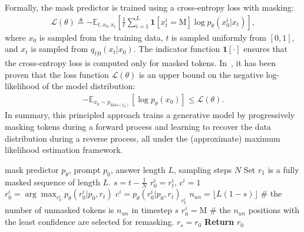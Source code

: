 \documentclass{article}
\begin{document}
Formally, the mask predictor is trained using a cross-entropy loss with masking:
\begin{align}
\label{eq:objective-app}
   \mathcal{L}(\theta) \triangleq -  \mathbb{E}_{t, x_0,  x_t}  \left[\frac{1}{t} \sum_{ i = 1 }^L \textbf{1}[x_t^i = \textrm{M}] \log p_{\theta}(x_0^i|x_t) \right], 
\end{align} 
where \( x_0 \) is sampled from the training data, \( t \) is sampled uniformly from \( [0, 1] \), and \( x_t \) is sampled from \( q_{t|0}(x_t| x_0) \). The indicator function \( \textbf{1}[\cdot] \) ensures that the cross-entropy loss is computed only for masked tokens. In~\citet{shi2024simplified, sahoo2024simple, ou2024your}, it has been proven that the loss function \( \mathcal{L}(\theta) \) is an upper bound on the negative log-likelihood of the model distribution:
\begin{align}
    - \mathbb{E}_{x_0\sim p_{\textrm{data}(x_0)}} \left[\log p_\theta(x_0) \right ]\le  \mathcal{L}(\theta).
\end{align}
In summary, this principled approach trains a generative model by progressively masking tokens during a forward process and learning to recover the data distribution during a reverse process, all under the (approximate) maximum likelihood estimation framework.

\begin{algorithm}[t!]
    \caption{Low-confidence Remasking Strategy of LLaDA}
    \label{alg:low-confidence-remask}
    \begin{algorithmic}[1]
        \REQUIRE mask predictor $p_{\theta}$, prompt $p_0$, answer length $L$, sampling steps $N$
        \STATE Set \( r_1 \) is a fully masked sequence of length \( L \).
            \STATE $s = t - \frac{1}{N}$
                    \STATE $r_0^i=r_t^i$, $c^i=1$
                \ELSE
                    \STATE $r_0^i = \arg\max_{r_0^i} p_{\theta}(r_0^i|p_0, r_t)$
                    \STATE $c^i = p_{\theta}(r_0^i|p_0, r_t)_{r_0^i}$
                \ENDIF
            \ENDFOR
            \STATE  $n_{un}=\lfloor L (1 - s) \rfloor$ \hfill \# the number of unmasked tokens is $n_{un}$ in timestep $s$
                    \STATE $r_0^i = \textrm{M}$ \hfill \# the $n_{un}$ positions with the least confidence are selected for remasking.
                \ENDIF
            \ENDFOR
        \STATE $r_s = r_0$
        \ENDFOR
        \STATE \textbf{Return} $r_0$
    \end{algorithmic}
\end{algorithm}
\end{document}
